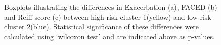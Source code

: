 \begin{figure}[h]
	\centering
	\caption{Boxplots illustrating the differences in Exacerbation (a), FACED (b) and Reiff score (c) between high-risk cluster 1(yellow) and low-risk cluster 2(blue). Statistical significance of these differences were calculated using ‘wilcoxon test’ and are indicated above as p-values.}
	\label{res2_fig4}
\end{figure}

